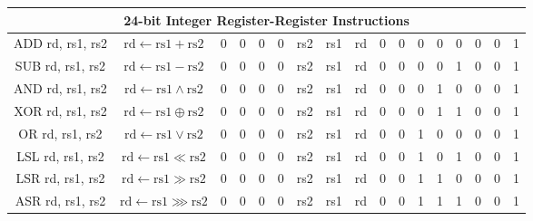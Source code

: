 \documentclass[a4paper,10pt]{article}
\begin{document}
\begin{landscape}
\begin{longtable}[c]{|c|c|@{}c@{}|@{}c@{}|@{}c@{}|@{}c@{}|@{}c@{}|@{}c@{}|@{}c@{}|@{}c@{}|@{}c@{}|@{}c@{}|@{}c@{}|@{}c@{}|@{}c@{}|@{}c@{}|@{}c@{}|@{}c@{}|@{}c@{}|@{}c@{}|@{}c@{}|@{}c@{}|@{}c@{}|@{}c@{}|@{}c@{}|@{}c@{}|}
\hline
\multicolumn{26}{|c|}{24-bit Integer Register-Register Instructions}                                                                                                                                                                                                                                                             \\\hline
ADD rd, rs1, rs2      & $\mathrm{rd} \leftarrow \mathrm{rs1} + \mathrm{rs2}$ & 0 & 0 & 0 & 0 & \multicolumn{4}{c|}{rs2}            & \multicolumn{4}{c|}{rs1}            & \multicolumn{4}{c|}{rd}      & 0              & 0                & 0   & 0   & 0   & 0 & 0 & 1 \\
SUB rd, rs1, rs2      & $\mathrm{rd} \leftarrow \mathrm{rs1} - \mathrm{rs2}$ & 0 & 0 & 0 & 0 & \multicolumn{4}{c|}{rs2}            & \multicolumn{4}{c|}{rs1}            & \multicolumn{4}{c|}{rd}      & 0              & 0                & 0   & 0   & 1   & 0 & 0 & 1 \\
AND rd, rs1, rs2      & $\mathrm{rd} \leftarrow \mathrm{rs1} \land \mathrm{rs2}$ & 0 & 0 & 0 & 0 & \multicolumn{4}{c|}{rs2}            & \multicolumn{4}{c|}{rs1}            & \multicolumn{4}{c|}{rd}      & 0              & 0                & 0   & 1   & 0   & 0 & 0 & 1 \\
XOR rd, rs1, rs2      & $\mathrm{rd} \leftarrow \mathrm{rs1} \oplus \mathrm{rs2}$ & 0 & 0 & 0 & 0 & \multicolumn{4}{c|}{rs2}            & \multicolumn{4}{c|}{rs1}            & \multicolumn{4}{c|}{rd}      & 0              & 0                & 0   & 1   & 1   & 0 & 0 & 1 \\
OR rd, rs1, rs2       & $\mathrm{rd} \leftarrow \mathrm{rs1} \lor \mathrm{rs2}$ & 0 & 0 & 0 & 0 & \multicolumn{4}{c|}{rs2}            & \multicolumn{4}{c|}{rs1}            & \multicolumn{4}{c|}{rd}      & 0              & 0                & 1   & 0   & 0   & 0 & 0 & 1 \\
LSL rd, rs1, rs2      & $\mathrm{rd} \leftarrow \mathrm{rs1} \ll \mathrm{rs2}$ & 0 & 0 & 0 & 0 & \multicolumn{4}{c|}{rs2}            & \multicolumn{4}{c|}{rs1}            & \multicolumn{4}{c|}{rd}      & 0              & 0                & 1   & 0   & 1   & 0 & 0 & 1 \\
LSR rd, rs1, rs2      & $\mathrm{rd} \leftarrow \mathrm{rs1} \gg \mathrm{rs2}$ & 0 & 0 & 0 & 0 & \multicolumn{4}{c|}{rs2}            & \multicolumn{4}{c|}{rs1}            & \multicolumn{4}{c|}{rd}      & 0              & 0                & 1   & 1   & 0   & 0 & 0 & 1 \\
ASR rd, rs1, rs2      & $\mathrm{rd} \leftarrow \mathrm{rs1} \ggg \mathrm{rs2}$ & 0 & 0 & 0 & 0 & \multicolumn{4}{c|}{rs2}            & \multicolumn{4}{c|}{rs1}            & \multicolumn{4}{c|}{rd}      & 0              & 0                & 1   & 1   & 1   & 0 & 0 & 1 \\


\end{longtable}
\end{landscape}
\end{document}

